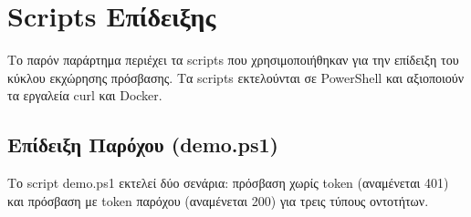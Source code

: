 \chapter{\textlatin{Scripts} Επίδειξης}
\label{app:demo-scripts}

Το παρόν παράρτημα περιέχει τα \textlatin{scripts} που χρησιμοποιήθηκαν
για την επίδειξη του κύκλου εκχώρησης πρόσβασης. Τα \textlatin{scripts}
εκτελούνται σε \textlatin{PowerShell} και αξιοποιούν τα εργαλεία
\textlatin{curl} και \textlatin{Docker}.

\section{Επίδειξη Παρόχου (\textlatin{demo.ps1})}
\label{app:demo-provider}

Το \textlatin{script} \textlatin{demo.ps1} εκτελεί δύο σενάρια: πρόσβαση
χωρίς \textlatin{token} (αναμένεται \textlatin{401}) και πρόσβαση
με \textlatin{token} παρόχου (αναμένεται \textlatin{200}) για τρεις
τύπους οντοτήτων.

